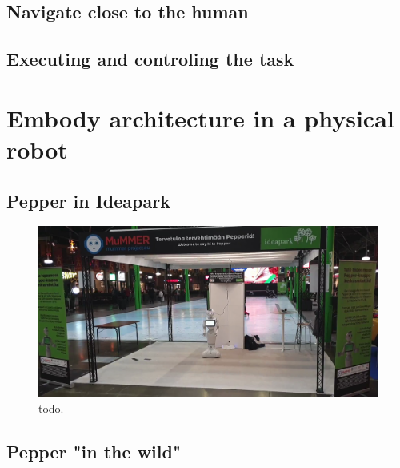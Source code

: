 \subsection{Navigate close to the human}

\subsection{Executing and controling the task}

\section{Embody architecture in a physical robot}

\subsection{Pepper in Ideapark}

\begin{figure}[ht!]
\centering
\includegraphics[scale=0.15]{figures/chapter8/pepper_mall.png}
\caption{\label{fig:chap8_pepper_mall} todo. }
\end{figure}

\subsection{Pepper "in the wild"}